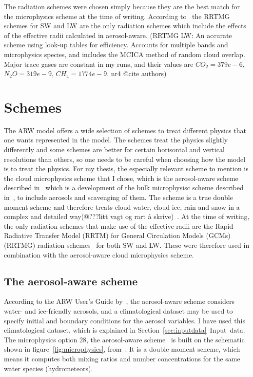 The radiation schemes were chosen simply because they are the best match for the microphysics scheme at the time of writing. According to~\citet{Thompson2014} the RRTMG schemes for SW and LW are the only radiation schemes which include the effects of the effective radii calculated in aerosol-aware. (RRTMG LW: An accurate scheme using look-up tables for efficiency. Accounts for multiple bands and microphysics species, and includes the MCICA method of random cloud overlap. Major trace gases are constant in my runs, and their values are $CO_2=379e-6$, $N_2O=319e-9$, $CH_4=1774e-9$. nr4 @cite authors)

\section{Schemes}
\label{sec:schemes}
The ARW model offers a wide selection of schemes to treat different physics that one wants represented in the model. The schemes treat the physics slightly differently and some schemes are better for certain horisontal and vertical resolutions than others, so one needs to be careful when choosing how the model is to treat the physics. For my thesis, the especially relevant scheme to mention is the cloud microphysics scheme that I chose, which is the aerosol-aware scheme described in~\citet{Thompson2014} which is a development of the bulk microphysisc scheme described in~\citet{Thompson2008}, to include aerosols and scavenging of them. The scheme is a true double moment scheme and therefore treats cloud water, cloud ice, rain and snow in a complex and detailed way(@???litt vagt og rart å skrive)~\citet{Thompson2014}. At the time of writing, the only radiation schemes that make use of the effective radii are the Rapid Radiative Transfer Model (RRTM) for General Circulation Models (GCMs) (RRTMG) radiation schemes~\citep{Mlawer1997, Iacono2000, Iacono2003, Iacono2008} for both SW and LW. These were therefore used in combination with the aerosol-aware cloud microphysics scheme.

\subsection{The aerosol-aware scheme}
According to the ARW User's Guide by~\citet{Wang2015}, the aerosol-aware scheme considers water- and ice-friendly aerosols, and a climatological dataset may be used to specify initial and boundary conditions for the aerosol variables. I have used this climatological dataset, which is explained in Section~\ref{sec:inputdata}~Input~data.
The microphysics option 28, the aerosol-aware scheme~\citep{Thompson2014} is built on the schematic shown in figure~\ref{fig:microphysics}, from~\citet{Reisner1998}. It is a double moment scheme, which means it computes both mixing ratios and number concentrations for the same water species (hydrometeors). 


